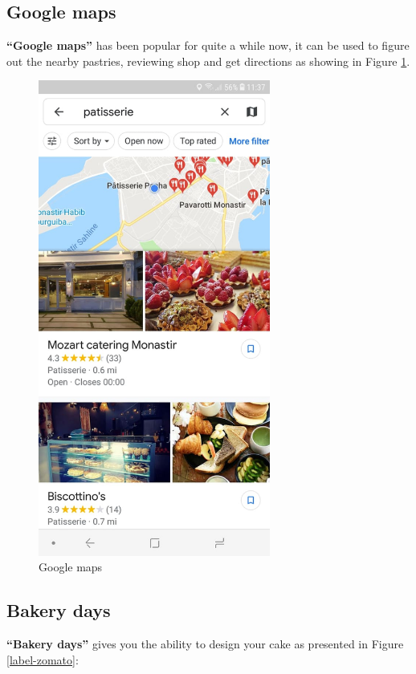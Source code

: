 \documentclass[12pt,a4paper]{report}
\begin{document}
	\subsection{Google maps}
	\textbf{``Google maps''} has been popular for quite a while now, it can be used to figure out the nearby pastries, reviewing shop and get directions as showing in Figure \ref{label-googlemaps}. \par
	\begin{figure}[H]
		\centering
		\includegraphics[width=3in,keepaspectratio]{googlemaps.jpg}
		\caption{Google maps\protect{}\protect\footnotemark[\thefootnote]}
		
		
		
		\label{label-googlemaps}
	\end{figure}
	\clearpage
	\subsection{Bakery days}
	\textbf{``Bakery days''} gives you the ability to design your cake as presented in Figure  \ref{label-zomato}:
	
\end{document}
